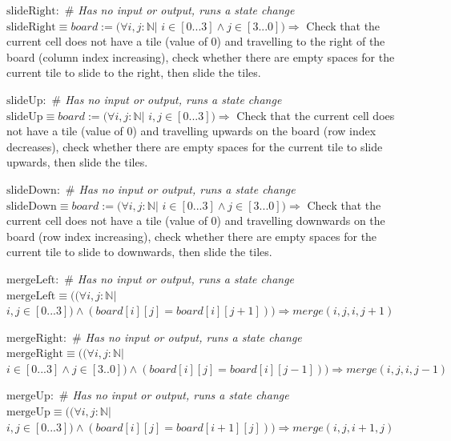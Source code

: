 \documentclass[12pt]{article}
\begin{document}
\noindent $\mbox{slideRight}:$ \textit{$\#$ Has no input or output, runs a state change}\\
\noindent $\mbox{slideRight} \equiv board := (\forall i, j :  \mathbb{N} |$ $i \in [0...3] \land j \in [3...0] ) \Rightarrow$  Check that the current cell does not have a tile (value of 0) and travelling to the right of the board (column index increasing), check whether there are empty spaces for the current tile to slide to the right, then slide the tiles. \newline

\noindent $\mbox{slideUp}:$ \textit{$\#$ Has no input or output, runs a state change}\\
\noindent $\mbox{slideUp} \equiv board := (\forall i, j :  \mathbb{N} |$ $i, j \in [0...3]) \Rightarrow$  Check that the current cell does not have a tile (value of 0) and travelling upwards on the board (row index decreases), check whether there are empty spaces for the current tile to slide upwards, then slide the tiles. \newline

\noindent $\mbox{slideDown}:$ \textit{$\#$ Has no input or output, runs a state change}\\
\noindent $\mbox{slideDown} \equiv board := (\forall i, j :  \mathbb{N} |$ $i \in [0...3] \land j \in [3...0] ) \Rightarrow$  Check that the current cell does not have a tile (value of 0) and travelling downwards on the board (row index increasing), check whether there are empty spaces for the current tile to slide to downwards, then slide the tiles. \newline

\noindent $\mbox{mergeLeft}:$ \textit{$\#$ Has no input or output, runs a state change}\\
\noindent $\mbox{mergeLeft} \equiv ((\forall i, j :  \mathbb{N} |$ $i, j \in [0...3]) \land (board[i][j] = board[i][j+1])) \Rightarrow merge(i, j, i, j+1)$  \newline

\noindent $\mbox{mergeRight}:$ \textit{$\#$ Has no input or output, runs a state change}\\
\noindent $\mbox{mergeRight} \equiv ((\forall i, j :  \mathbb{N} |$ $i \in [0...3] \land j \in[3..0]) \land (board[i][j] = board[i][j-1])) \Rightarrow merge(i, j, i, j-1)$ \newline

\noindent $\mbox{mergeUp}:$ \textit{$\#$ Has no input or output, runs a state change}\\
\noindent $\mbox{mergeUp} \equiv ((\forall i, j :  \mathbb{N} |$ $i, j \in [0...3]) \land (board[i][j] = board[i+1][j])) \Rightarrow merge(i, j, i+1, j)$  \newline
\end{document}
